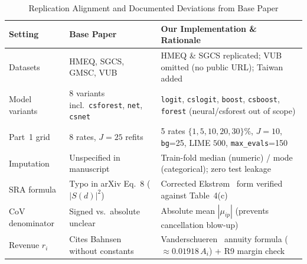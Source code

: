 \documentclass[conference]{IEEEtran}
\begin{document}
\begin{table}[!t]
\centering
\caption{Replication Alignment and Documented Deviations from Base Paper}
\label{tab:deviations}
\scriptsize
\renewcommand{\arraystretch}{0.86}
\setlength{\tabcolsep}{3.0pt}
\begin{tabular}{@{}p{1.9cm}p{2.6cm}p{3.4cm}@{}}
\toprule
\textbf{Setting} & \textbf{Base Paper~\cite{ballegeer2025}} & \textbf{Our Implementation \& Rationale} \\
\midrule
Datasets & HMEQ, SGCS, GMSC, VUB & HMEQ \& SGCS replicated; VUB omitted (no public URL); Taiwan added \\
Model variants & 8 variants incl.\ \texttt{csforest}, \texttt{net}, \texttt{csnet} & \texttt{logit}, \texttt{cslogit}, \texttt{boost}, \texttt{csboost}, \texttt{forest} (neural/csforest out of scope) \\
Part~1 grid & 8 rates, $J{=}25$ refits & 5 rates $\{1,5,10,20,30\}\%$, $J{=}10$, \texttt{bg}=25, LIME $500$, \texttt{max\_evals}=150 \\
Imputation & Unspecified in manuscript & Train-fold median (numeric) / mode (categorical); zero test leakage \\
SRA formula & Typo in arXiv Eq.~8 ($|S(d)|^2$) & Corrected Ekstr\o m~\cite{ekstrom2019} form verified against Table~4(c) \\
CoV denominator & Signed vs.\ absolute unclear & Absolute mean $|\mu_{ip}|$ (prevents cancellation blow-up) \\
Revenue $r_i$ & Cites Bahnsen~\cite{bahnsen2014} without constants & Vanderschueren~\cite{vanderschueren2022b} annuity formula ($\approx 0.01918\, A_i$) + R9 margin check \\
\bottomrule
\end{tabular}
\end{table}
\end{document}
